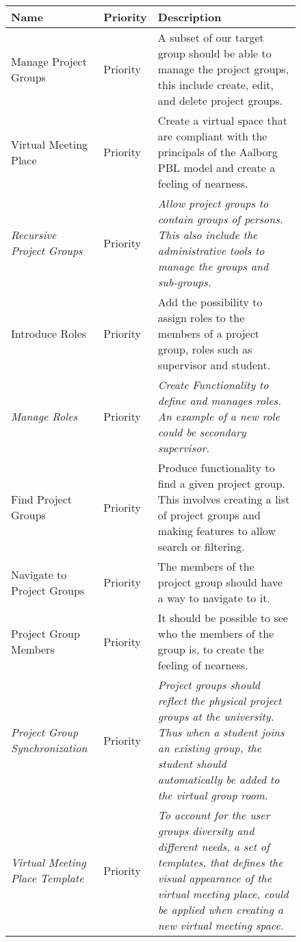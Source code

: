\begin{figure}%
\begin{tabular}{|p{}|p{}|p{}|}
	\hline
	
	\textbf{Name} & \textbf{Priority} & \textbf{Description} \\
	\hline
	Manage Project Groups & Priority & A subset of our target group should be able to manage the project groups, this include create, edit, and delete project groups.  \\
	\hline
	Virtual Meeting Place & Priority & Create a virtual space that are compliant with the principals of the Aalborg PBL model and create a feeling of nearness.  \\
	\hline
	\textit{Recursive Project Groups} & Priority & \textit{Allow project groups to contain groups of persons. This also include the administrative tools to manage the groups and sub-groups.} \\
	\hline
	Introduce Roles & Priority & Add the possibility to assign roles to the members of a project group, roles such as supervisor and student.   \\
	\hline
	\textit{Manage Roles} & Priority & \textit{Create Functionality to define and manages roles. An example of a new role  could be secondary supervisor.} \\
	\hline
	Find Project Groups & Priority & Produce functionality to find a given project group. This involves creating a list of project groups and making features to allow search or filtering. \\
	\hline
	Navigate to Project Groups & Priority & The members of the project group should have a way to navigate to it. \\
	\hline
	Project Group Members & Priority & It should be possible to see who the members of the group is, to create the feeling of nearness. \\
	\hline
	\textit{Project Group Synchronization} & Priority & \textit{Project groups should reflect the physical project groups at the university. Thus when a student joins an existing group, the student should automatically be added to the virtual group room.}  \\
	\hline 
	\textit{Virtual Meeting Place Template} & Priority & \textit{To account for the user groups diversity and different needs, a set of templates, that defines the visual appearance of the virtual meeting place, could be applied when creating a new virtual meeting space.}  \\
	\hline 
\end{tabular}
\label{fig:productbacklog}
\end{figure}


